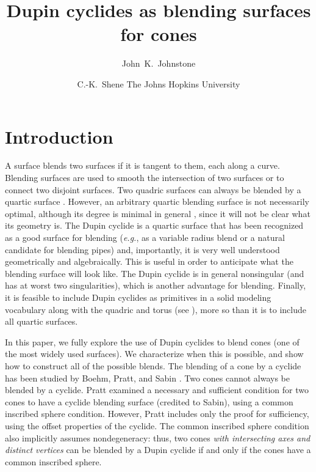 
\newtheorem{remark}{Remark}[section]
\newtheorem{cor}{Corollary}[section]
\newcommand{\QED}{\vrule height 1.4ex width 1.0ex depth -.1ex\ } %

\title{
Dupin cyclides as blending surfaces for cones
}

\author{
John~K.~Johnstone \and C.-K.~Shene
\affil The Johns Hopkins University
}




\maketitle

\section{Introduction}

A surface blends two surfaces if it is tangent to them, each along a curve.
Blending surfaces are used to smooth the intersection of two surfaces
or to connect two disjoint surfaces.
Two quadric surfaces can always be blended by a quartic 
surface \cite{hoffmann-hopcroft:1986,hoffmann-hopcroft:1987}.
However, an arbitrary quartic blending surface is not necessarily optimal,
although its degree is minimal in general \cite{hoffmann-hopcroft:1986}, 
since it will not be clear what its geometry is.
The Dupin cyclide is a quartic surface that has been recognized as a
good surface for blending 
\cite{boehm:1990,chandru-dutta-hoffmann:1990,dutta:1989,pratt:1989,pratt:1990} 
({\em e.g.}, as a variable radius blend or a natural candidate for 
blending pipes)
and, importantly, it is 
very well understood geometrically and algebraically.
This is useful in order to anticipate what the blending surface will 
look like.
The Dupin cyclide is in general nonsingular (and has at worst two
singularities), which is another advantage for blending.
Finally, it is feasible to include Dupin cyclides 
as primitives in a solid modeling vocabulary 
along with the quadric and torus (see \cite{jj92}),
more so than it is to include all quartic surfaces.

In this paper, we fully explore the use of Dupin cyclides to blend cones
(one of the most widely used surfaces).
We characterize when this is possible, and show how to construct all of the
possible blends.
The blending of a cone 
by a cyclide has been studied by Boehm, Pratt, and Sabin
\cite{boehm:1990,pratt:1989,pratt:1990}.
Two cones cannot always be blended by a cyclide.
Pratt \cite{pratt:1990} 
examined a necessary and sufficient condition for two cones
to have a cyclide blending surface (credited to Sabin), 
using a common inscribed sphere condition.
However, Pratt includes only the proof for sufficiency, using the offset 
properties of the cyclide.
The common inscribed sphere condition also implicitly assumes nondegeneracy:
thus, two cones {\em with intersecting axes and distinct
vertices} can be blended by a Dupin cyclide if and only if
the cones have a common inscribed sphere.

